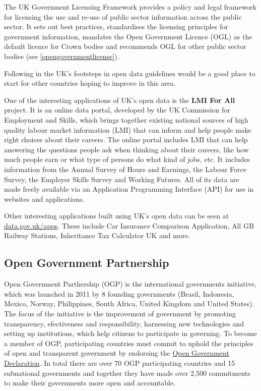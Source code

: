 \documentclass[thesis=B,english]{FITthesis}[2012/06/26]
\begin{document}
The UK Government Licensing Framework provides a policy and legal framework for licensing the use and re-use of public sector information across the public sector. It sets out best practices, standardises the licensing principles for government information, mandates the Open Government Licence (OGL) as the default licence for Crown bodies and recommends OGL for other public sector bodies (see \ref{opengovernmentlicense}).

Following in the UK’s footsteps in open data guidelines would be a good place to start for other countries hoping to improve in this area.\cite{UKopendatagov}

One of the interesting applications of UK's open data is the \textbf{LMI For All} project. It is an online data portal, developed by the UK Commission for Employment and Skills, which brings together existing national sources of high quality labour market information (LMI) that can inform and help people make right choices about their careers. The online portal includes LMI that can help answering the questions people ask when thinking about their careers, like how much people earn or what type of persons do what kind of jobs, etc. It includes information from the Annual Survey of Hours and Earnings, the Labour Force Survey, the Employer Skills Survey and Working Futures. All of its data are made freely available  via an Application Programming Interface (API) for use in websites and applications.

Other interesting applications built using UK's open data can be seen at \href{https://data.gov.uk/apps}{data.gov.uk/apps}. These include Car Insurance Comparison Application, All GB Railway Stations, Inheritance Tax Calculator UK and more.


	\subsection{Open Government Partnership}
	Open Government Parthership (OGP) is the international governments initiative, which was launched in 2011 by 8 founding governments (Brasil, Indonesia, Mexico, Norway, Philippines, South Africa, United Kingdom and United States). The focus of the initiative is the improvement of government by promoting transparency, efectiveness and responsibility, harnessing new technologies and setting up institutions, which help citizens to participate in governing. To become a member of OGP, participating countries must commit to uphold the principles of open and transparent government by endorsing the \href{https://www.opengovpartnership.org/open-government-declaration}{Open Government Declaration}. In total there are over 70 OGP participating countries and 15 subnational governments and together they have made over 2,500 commitments to make their governments more open and accountable. \cite{opengovernmentpartnership}
	
\end{document}
